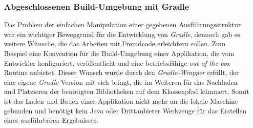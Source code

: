 		\subsubsection{Abgeschlossenen Build-Umgebung mit Gradle} %
		Das Problem der einfachen Manipulation einer gegebenen Ausführungsstruktur war ein wichtiger Beweggrund für die Entwicklung von \textit{Gradle}, dennoch gab es weitere Wünsche, die das Arbeiten mit Fremdcode erleichtern sollen. Zum Beispiel eine Konvention für die Build-Umgebung einer Applikation, die vom Entwickler konfiguriert, veröffentlicht und eine betriebsfähige \textit{out of the box} Routine anbietet. Dieser Wunsch wurde durch den \textit{Gradle-Wrapper} erfüllt, der eine eigene \textit{Gradle} Version mit sich bringt, die im Weiteren für das Nachladen und Platzieren der benötigten Bibliotheken auf dem Klassenpfad kümmert. Somit ist das Laden und Bauen einer Applikation nicht mehr an die lokale Maschine gebunden und benötigt kein Java oder Drittanbieter Werkzeuge für das Erstellen eines ausführbaren Ergebnisses. 

